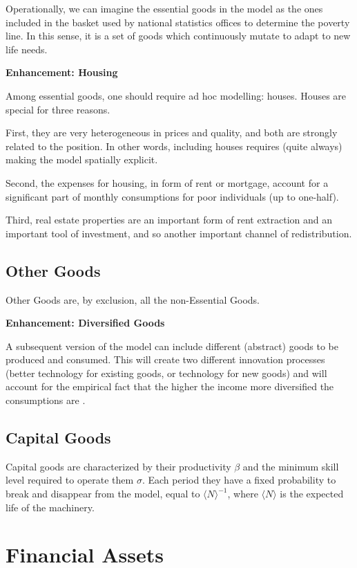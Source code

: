 \documentclass[a4paper, headings=standardclasses]{scrartcl}
\newenvironment{enh}[1][]{\begin{framed}\noindent\textbf{Enhancement: #1}\par}{\end{framed}}
\begin{document}
Operationally, we can imagine the essential goods in the model as the ones included in the basket used by national statistics offices to determine the poverty line. In this sense, it is a set of goods which continuously mutate to adapt to new life needs.

\begin{enh}[Housing]
	Among essential goods, one should require ad hoc modelling: houses. Houses are special for three reasons.

	First, they are very heterogeneous in prices and quality, and both are strongly related to the position. In other words, including houses requires (quite always) making the model spatially explicit.

	Second, the expenses for housing, in form of rent or mortgage, account for a significant part of monthly consumptions for poor individuals (up to one-half).

	Third, real estate properties are an important form of rent extraction and an important tool of investment, and so another important channel of redistribution.
\end{enh}

\subsection{Other Goods}
Other Goods are, by exclusion, all the non-Essential Goods.

\begin{enh}[Diversified Goods]
	A subsequent version of the model can include different (abstract) goods to be produced and consumed. This will create two different innovation processes (better technology for existing goods, or technology for new goods) and will account for the empirical fact that the higher the income more diversified the consumptions are \parencite[cfr.][§2]{didomenico2022}.
\end{enh}

\subsection{Capital Goods}
Capital goods are characterized by their productivity $\beta$ and the minimum skill level required to operate them $\sigma$. Each period they have a fixed probability to break and disappear from the model, equal to $\langle N \rangle^{-1}$, where $\langle N \rangle$ is the expected life of the machinery.

\section{Financial Assets}
\end{document}
